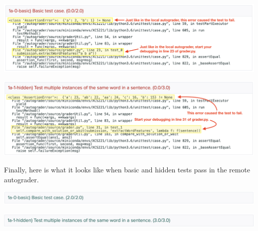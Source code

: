 \begin{center}
\includegraphics[width=1\textwidth]{00-instructions/remote-basic-failed.png}
\end{center}

\begin{center}
\includegraphics[width=1\textwidth]{00-instructions/remote-hidden-failed.png}
\end{center}

Finally, here is what it looks like when basic and hidden tests pass in the
remote autograder.

\begin{center}
\includegraphics[width=1\textwidth]{00-instructions/remote-basic-passed.png}
\end{center}

\begin{center}
\includegraphics[width=1\textwidth]{00-instructions/remote-hidden-passed.png}
\end{center}
